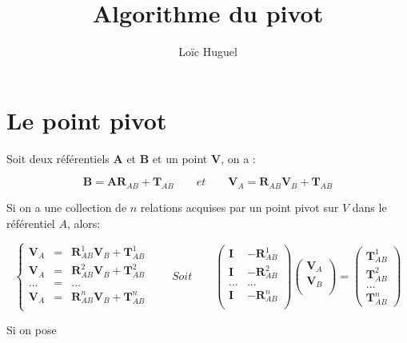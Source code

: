 \documentclass[12pt,a4paper]{article}
\title{Algorithme du pivot}
\author{Loïc Huguel}
\begin{document}
	\maketitle
	
	\tableofcontents
	
	\newpage
	\section{Le point pivot}
	
	Soit deux référentiels $\mathbf{A}$ et $\mathbf{B}$ et un point $\mathbf{V}$, on a :
	
	\[
		\mathbf{B}=\mathbf{A} \mathbf{R}_{AB} +\mathbf{T}_{AB} \qquad et \qquad
		\mathbf{V}_A= \mathbf{R}_{AB} \mathbf{V}_B +\mathbf{T}_{AB}
	\]
	
	Si on a une collection de $n$ relations acquises par un point pivot sur $V$ dans le référentiel $A$, alors:	
	
	\[
	\left\{
	\begin{array}{ccc}
	\mathbf{V}_A&=& \mathbf{R}^1_{AB} \mathbf{V}_B +\mathbf{T}^1_{AB}\\
	\mathbf{V}_A&=& \mathbf{R}^2_{AB} \mathbf{V}_B +\mathbf{T}^2_{AB}\\
	...&=&...\\
	\mathbf{V}_A&=& \mathbf{R}^n_{AB} \mathbf{V}_B +\mathbf{T}^n_{AB}\\
	\end{array}
	\right.
	\qquad
	Soit
	\qquad
	\left(
	\begin{array}{c|c}
	\mathbf{I} & -\mathbf{R}^1_{AB}\\
	\mathbf{I} & -\mathbf{R}^2_{AB}\\
	...&...\\
	\mathbf{I} & -\mathbf{R}^n_{AB}\\
	\end{array}
	\right)		
	\left(
	\begin{array}{c}
	\mathbf{V}_A \\
	\mathbf{V}_B \\
	\end{array}
	\right)
	=
	\left(
	\begin{array}{c}
	\mathbf{T}^1_{AB} \\
	\hline
	\mathbf{T}^2_{AB} \\
	\hline
	...\\
	\hline
	\mathbf{T}^n_{AB}
	\end{array}
	\right)
	\]

	Si on pose 
	
\end{document}
